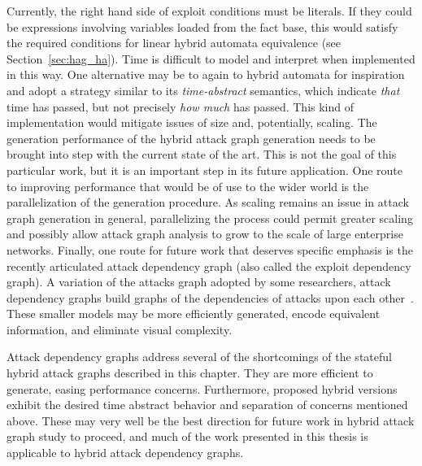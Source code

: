 Currently, the right hand side of exploit conditions must be literals. If they
could be expressions involving variables loaded from the fact base, this would 
satisfy the required conditions for linear hybrid automata equivalence (see
Section~\ref{sec:hag_ha}).
Time is difficult to model and interpret when implemented in this way. One
alternative may be to again to hybrid automata for inspiration and
adopt a strategy similar to its \emph{time-abstract} semantics,
which indicate \emph{that} time has passed, but not precisely \emph{how much}
has passed. This kind of implementation would mitigate issues of size and,
potentially, scaling.
The generation performance of the hybrid attack graph generation needs to be
brought into step with the current state of the art. This is not the goal of
this particular work, but it is an important step in its future application.
One route to improving performance that would be of use to the wider world is
the parallelization of the generation procedure. As scaling remains an issue
in attack graph generation in general, parallelizing the process could permit
greater scaling and possibly allow attack graph analysis to grow to the scale
of large enterprise networks.
Finally, one route for future work that deserves specific emphasis is the recently
articulated attack dependency graph (also called the exploit dependency graph).
A variation of the attacks graph adopted by some researchers, attack dependency
graphs build graphs of the dependencies of attacks upon each 
other~\cite{jajodia2005topological, noel2004managing}. These smaller models may
be more efficiently generated, encode equivalent information, and eliminate 
visual complexity.

Attack dependency graphs address several of the shortcomings of the stateful
hybrid attack graphs described in this chapter. They are more efficient to
generate, easing performance concerns. Furthermore, proposed hybrid 
versions~\cite{louthan2011toward} exhibit the
desired time abstract behavior and separation of concerns mentioned above. These
may very well be the best direction for future work in hybrid attack graph
study to proceed, and much of the work presented in this thesis is applicable to
hybrid attack dependency graphs.
